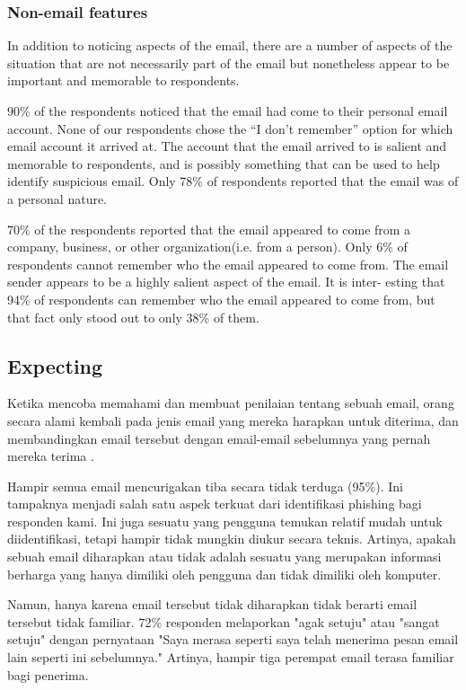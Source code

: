 \documentclass[lettersize,journal]{IEEEtran}
\begin{document}
\subsubsection{Non-email features}

In addition to noticing aspects of the email, there are a number of aspects of
the situation that are not necessarily part of the email but nonetheless appear
to be important and memorable to respondents.

90\% of the respondents noticed that the email had come to their personal email account. None of our respondents chose the “I don’t remember” option for which email account it arrived at. The account that the email arrived to is salient and memorable to respondents, and is possibly something that can be used to help identify suspicious email. Only 78\% of respondents reported that the email was of a personal nature.

70\% of the respondents reported that the email appeared
to come from a company, business, or other organization(i.e. from a person). Only 6\% of respondents cannot remember
who the email appeared to come from. The email sender
appears to be a highly salient aspect of the email. It is inter-
esting that 94\% of respondents can remember who the email
appeared to come from, but that fact only stood out to only
38\% of them.

\subsection{Expecting}

Ketika mencoba memahami dan membuat penilaian tentang sebuah email, orang
secara alami kembali pada jenis email yang mereka harapkan untuk diterima, dan
membandingkan email tersebut dengan email-email sebelumnya yang pernah mereka
terima \cite{tigaempat}.

Hampir semua email mencurigakan tiba secara tidak terduga (95\%). Ini tampaknya
menjadi salah satu aspek terkuat dari identifikasi phishing bagi responden
kami. Ini juga sesuatu yang pengguna temukan relatif mudah untuk
diidentifikasi, tetapi hampir tidak mungkin diukur secara teknis. Artinya,
apakah sebuah email diharapkan atau tidak adalah sesuatu yang merupakan
informasi berharga yang hanya dimiliki oleh pengguna dan tidak dimiliki oleh
komputer.

Namun, hanya karena email tersebut tidak diharapkan tidak berarti email
tersebut tidak familiar. 72\% responden melaporkan "agak setuju" atau "sangat
setuju" dengan pernyataan "Saya merasa seperti saya telah menerima pesan email
lain seperti ini sebelumnya." Artinya, hampir tiga perempat email terasa
familiar bagi penerima.
\end{document}
